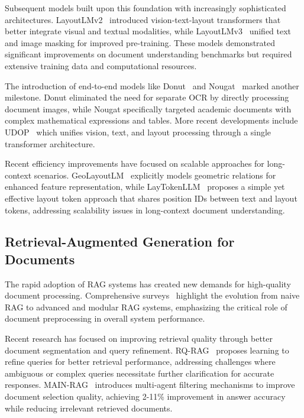 \documentclass{article}
\begin{document}
Subsequent models built upon this foundation with increasingly sophisticated architectures. LayoutLMv2~\cite{xu2021layoutlmv2} introduced vision-text-layout transformers that better integrate visual and textual modalities, while LayoutLMv3~\cite{huang2022layoutlmv3} unified text and image masking for improved pre-training. These models demonstrated significant improvements on document understanding benchmarks but required extensive training data and computational resources.

The introduction of end-to-end models like Donut~\cite{kim2021donut} and Nougat~\cite{blecher2023nougat} marked another milestone. Donut eliminated the need for separate OCR by directly processing document images, while Nougat specifically targeted academic documents with complex mathematical expressions and tables. More recent developments include UDOP~\cite{tang2022udop} which unifies vision, text, and layout processing through a single transformer architecture.

Recent efficiency improvements have focused on scalable approaches for long-context scenarios. GeoLayoutLM~\cite{luo2023geolayoutlm} explicitly models geometric relations for enhanced feature representation, while LayTokenLLM~\cite{zhu2025laytokenllm} proposes a simple yet effective layout token approach that shares position IDs between text and layout tokens, addressing scalability issues in long-context document understanding.

\subsection{Retrieval-Augmented Generation for Documents}

The rapid adoption of RAG systems has created new demands for high-quality document processing. Comprehensive surveys~\cite{gao2023retrieval,zhao2024comprehensive} highlight the evolution from naive RAG to advanced and modular RAG systems, emphasizing the critical role of document preprocessing in overall system performance.

Recent research has focused on improving retrieval quality through better document segmentation and query refinement. RQ-RAG~\cite{chan2024rq} proposes learning to refine queries for better retrieval performance, addressing challenges where ambiguous or complex queries necessitate further clarification for accurate responses. MAIN-RAG~\cite{chang2025main} introduces multi-agent filtering mechanisms to improve document selection quality, achieving 2-11\% improvement in answer accuracy while reducing irrelevant retrieved documents.
\end{document}
